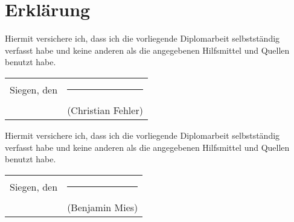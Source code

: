 

\chapter{Erklärung}

\thispagestyle{empty}

Hiermit versichere ich, dass ich die vorliegende Diplomarbeit selbstst\"andig
verfasst habe und keine anderen als die angegebenen Hilfsmittel und Quellen
benutzt habe.\vskip 1cm
\begin{tabular}{lc}
Siegen, den \date{\today} & \rule{6.5cm}{0.5pt} \\
                   & (Christian Fehler)
\end{tabular}\vskip 2cm

\noindent
Hiermit versichere ich, dass ich die vorliegende Diplomarbeit selbstst\"andig
verfasst habe und keine anderen als die angegebenen Hilfsmittel und Quellen
benutzt habe.\vskip 1cm
\begin{tabular}{lc}
Siegen, den \date{\today} & \rule{6.5cm}{0.5pt} \\
                   & (Benjamin Mies)
\end{tabular}
